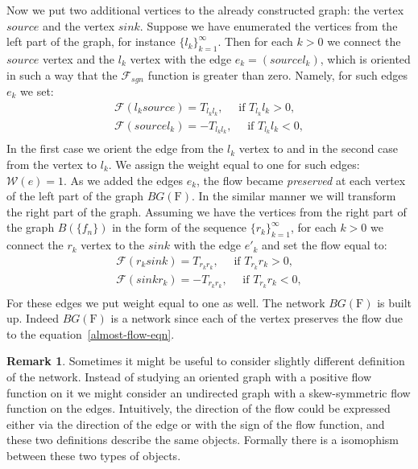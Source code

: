 \documentclass[12pt]{article}
\theoremstyle{definition}
\newtheorem{remark}{Remark}
\newcommand{\fsys}{\mathrm{F}}
\newcommand{\wt}{\mathcal{W}}
\newcommand{\flow}{\mathcal{F}}
\newcommand{\flowsgn}{\mathcal{F}_{sgn}}
\newcommand{\source}{\mathit{source}}
\newcommand{\sink}{\mathit{sink}}
\numberwithin{remark}{section}
\numberwithin{theorem}{section}
\numberwithin{prop}{section}
\numberwithin{equation}{section}
\numberwithin{lemma}{section}
\numberwithin{prop_under_lemma}{lemma}
\begin{document}
    Now we put two additional vertices to the already constructed graph:
    the vertex $\source$ and the vertex $\sink$.
    Suppose we have enumerated the vertices from the left part of the graph, for instance $\{l_k\}_{k=1}^\infty$.
    Then for each $k > 0$ we connect the $\source$ vertex and the $l_k$ vertex with
    the edge $e_k = (\source l_k)$, which is oriented in such a way that the $\flowsgn$ function
    is greater than zero. Namely, for such edges $e_k$ we set:
    \begin{align*}
      \flow(l_k \source) = T_{l_k l_k}, \quad \text{ if } T_{l_k}{l_k} > 0,\\
      \flow(\source l_k) = -T_{l_k l_k}, \quad \text { if } T_{l_k}{l_k} < 0,\\
    \end{align*}
    In the first case we orient the edge from the $l_k$ vertex to \source and in the second case from the 
    \source vertex to $l_k$.
    We assign the weight equal to one for such edges: $\wt(e) = 1$.
    As we added the edges ${e_k}$, the flow became \emph{preserved} at each vertex of the left part of the graph $BG(\fsys)$.
    In the similar manner we will transform the right part of the graph.
    Assuming we have the vertices from the right part of the graph $B(\{f_n\})$ in the form of the sequence $\{r_k\}_{k=1}^\infty$,
    for each $k > 0$ we connect the $r_k$ vertex to the $\sink$ with the edge $e'_k$
    and set the flow equal to:
    \begin{align*}
      \flow(r_k \sink) = T_{r_k r_k}, \quad \text{ if } T_{r_k}{r_k} > 0,\\
      \flow(\sink r_k) = -T_{r_k r_k}, \quad \text { if } T_{r_k}{r_k} < 0,\\
    \end{align*}
    For these edges we put weight equal to one as well.
    The network $BG(\fsys)$ is built up.
    Indeed $BG(\fsys)$ is a network since each of the vertex preserves
    the flow due to the equation~\eqref{almost-flow-eqn}.
    \begin{remark}
      Sometimes it might be useful to consider slightly different definition of the network.
      Instead of studying an oriented graph with a positive flow function on it we might consider
      an undirected graph with a skew-symmetric flow function on the edges.
      Intuitively, the direction of the flow could be expressed either via the direction of the edge
      or with the sign of the flow function, and these two definitions describe the same objects.
      Formally there is a isomophism between these two types of objects.
    \end{remark}
\end{document}
